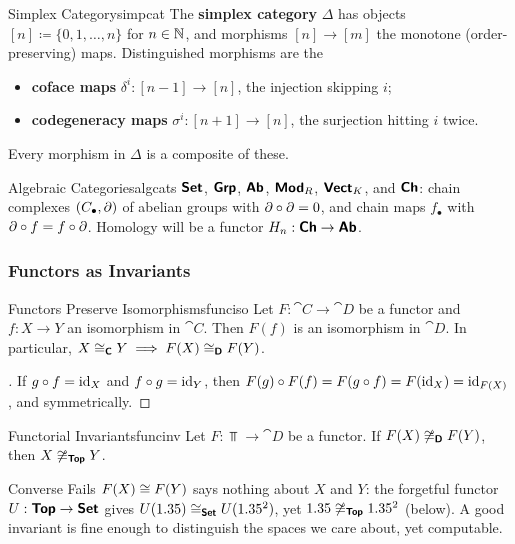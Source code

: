 \begin{definition}{Simplex Category}{simpcat}
    The \textbf{simplex category} $\Delta$ has objects $[n]\coloneqq\{0,1,\dots,n\}$ for $n\in\mathbb{N}$, and morphisms $[n]\to[m]$ the monotone (order-preserving) maps. Distinguished morphisms are the
    \begin{itemize}
        \item \textbf{coface maps} $\delta^i:[n-1]\to[n]$, the injection skipping $i$;
        \item \textbf{codegeneracy maps} $\sigma^i:[n+1]\to[n]$, the surjection hitting $i$ twice.
    \end{itemize}
    Every morphism in $\Delta$ is a composite of these.
\end{definition}

\begin{example}{Algebraic Categories}{algcats}
    $\bm{\mathsf{Set}}$, $\bm{\mathsf{Grp}}$, $\bm{\mathsf{Ab}}$, $\bm{\mathsf{Mod}}_R$, $\bm{\mathsf{Vect}}_K$, and $\bm{\mathsf{Ch}}$: chain complexes $(C_\bullet,\partial)$ of abelian groups with $\partial\circ\partial=0$, and chain maps $f_\bullet$ with $\partial\circ f=f\circ\partial$. Homology will be a functor $H_n:\bm{\mathsf{Ch}}\to\bm{\mathsf{Ab}}$.
\end{example}

\subsubsection{Functors as Invariants}

\begin{proposition}{Functors Preserve Isomorphisms}{funciso}
    Let $F:\cat{C}\to\cat{D}$ be a functor and $f:X\to Y$ an isomorphism in $\cat{C}$. Then $F(f)$ is an isomorphism in $\cat{D}$. In particular, $X\cong_{\bm{\mathsf{C}}}Y\implies F(X)\cong_{\bm{\mathsf{D}}}F(Y)$.
\end{proposition}
\begin{proof}[]
    If $g\circ f=\operatorname{id}_X$ and $f\circ g=\operatorname{id}_Y$, then $F(g)\circ F(f)=F(g\circ f)=F(\operatorname{id}_X)=\operatorname{id}_{F(X)}$, and symmetrically.
\end{proof}

\begin{corollary}{Functorial Invariants}{funcinv}
    Let $F:\Top\to\cat{D}$ be a functor. If $F(X)\not\cong_{\bm{\mathsf{D}}}F(Y)$, then $X\not\cong_{\bm{\mathsf{Top}}}Y$.
\end{corollary}

\begin{remark}{Converse Fails}{}
    $F(X)\cong F(Y)$ says nothing about $X$ and $Y$: the forgetful functor $U:\bm{\mathsf{Top}}\to\bm{\mathsf{Set}}$ gives $U(1.35)\cong_{\bm{\mathsf{Set}}}U(1.35^2)$, yet $1.35\not\cong_{\bm{\mathsf{Top}}}1.35^2$ (below). A good invariant is fine enough to distinguish the spaces we care about, yet computable.
\end{remark}

